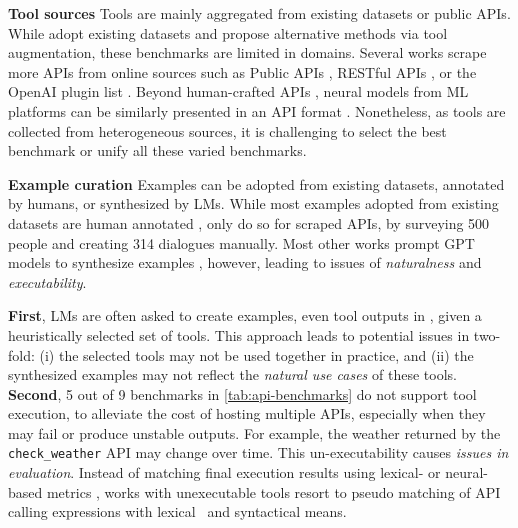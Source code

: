 \noindent \textbf{Tool sources} \quad
Tools are mainly aggregated from existing datasets or public APIs.
While \citet{xu2023tool,zhuang2023toolqa} adopt existing datasets and propose alternative methods via tool augmentation, these benchmarks are limited in domains. Several works scrape more APIs from online sources such as Public APIs \citep{tang2023toolalpaca}, RESTful APIs \citep{tang2023toolalpaca}, or the OpenAI plugin list \citep{huang2024metatool}. Beyond human-crafted APIs \citep{li-etal-2023-api}, neural models from ML platforms can be similarly presented in an API format \citep{patil2023gorilla,shen2023hugginggpt,shen2023taskbench}. 
Nonetheless, as tools are collected from heterogeneous sources, it is challenging to select the best benchmark or unify all these varied benchmarks.


\noindent \textbf{Example curation} \quad
Examples can be adopted from existing datasets, annotated by humans, or synthesized by LMs.
While most examples adopted from existing datasets are human annotated \citep{xu2023tool}, only \citet{li-etal-2023-api} do so for scraped APIs, by surveying 500 people and creating 314 dialogues manually.
Most other works prompt GPT models to synthesize examples \citep{qin2023toolllm,tang2023toolalpaca,shen2023taskbench,zhuang2023toolqa, huang2024metatool}, however, leading to issues of \textit{naturalness} and \textit{executability}.

\textbf{First}, LMs are often asked to create examples, even tool outputs in \citet{tang2023toolalpaca}, given a heuristically selected set of tools. This approach leads to potential issues in two-fold: (i) the selected tools may not be used together in practice, and (ii) the synthesized examples may not reflect the \textit{natural use cases} of these tools.
\textbf{Second}, 5 out of 9 benchmarks in \autoref{tab:api-benchmarks} do not support tool execution, to alleviate the cost of hosting multiple APIs, especially when they may fail or produce unstable outputs. For example, the weather returned by the \texttt{check\_weather} API may change over time. This un-executability causes \textit{issues in evaluation}. Instead of matching final execution results using lexical- \citep{li-etal-2023-api} or neural-based metrics \citep{tang2023toolalpaca, qin2023toolllm}, works with unexecutable tools resort to pseudo matching of API calling expressions with lexical~\citep{tang2023toolalpaca,shen2023hugginggpt,huang2024metatool} and syntactical \citep{patil2023gorilla, shen2023taskbench} means.



